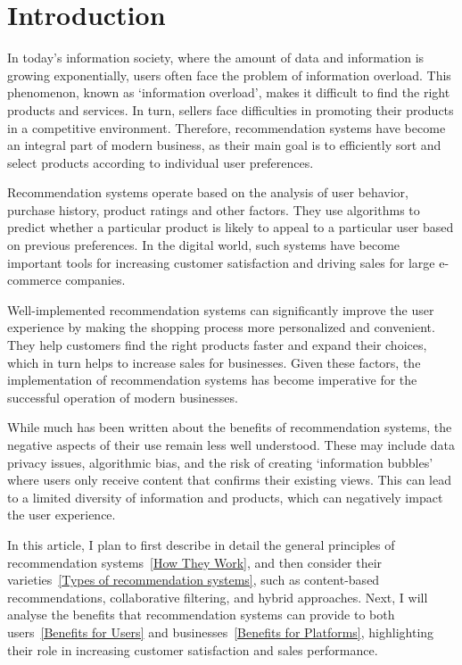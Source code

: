 \documentclass[10pt,twoside,slovak,a4paper]{article}
\begin{document}
\section{Introduction}
In today's information society, where the amount of data and information is growing exponentially, users often face the problem of information overload. This phenomenon, known as ‘information overload’, makes it difficult to find the right products and services. In turn, sellers face difficulties in promoting their products in a competitive environment. Therefore, recommendation systems have become an integral part of modern business, as their main goal is to efficiently sort and select products according to individual user preferences.

Recommendation systems operate based on the analysis of user behavior, purchase history, product ratings and other factors. They use algorithms to predict whether a particular product is likely to appeal to a particular user based on previous preferences. In the digital world, such systems have become important tools for increasing customer satisfaction and driving sales for large e-commerce companies.

Well-implemented recommendation systems can significantly improve the user experience by making the shopping process more personalized and convenient. They help customers find the right products faster and expand their choices, which in turn helps to increase sales for businesses. Given these factors, the implementation of recommendation systems has become imperative for the successful operation of modern businesses.


While much has been written about the benefits of recommendation systems, the negative aspects of their use remain less well understood. These may include data privacy issues, algorithmic bias, and the risk of creating ‘information bubbles’ where users only receive content that confirms their existing views. This can lead to a limited diversity of information and products, which can negatively impact the user experience.

In this article, I plan to first describe in detail the general principles of recommendation systems~\ref{How They Work}, and then consider their varieties~\ref{Types of recommendation systems}, such as content-based recommendations, collaborative filtering, and hybrid approaches. Next, I will analyse the benefits that recommendation systems can provide to both users~\ref{Benefits for Users} and businesses~\ref{Benefits for Platforms}, highlighting their role in increasing customer satisfaction and sales performance.
\end{document}
